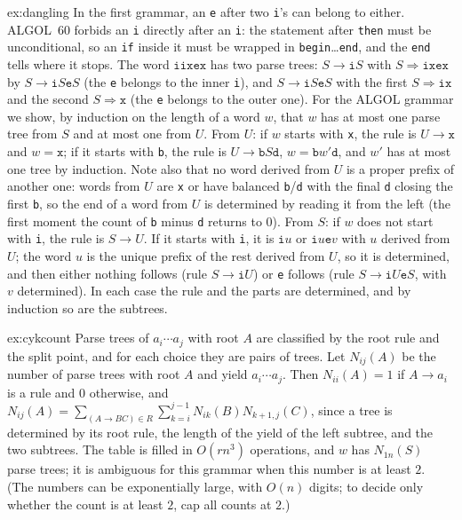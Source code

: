 \begin{solution}{ex:dangling}
\idea In the first grammar, an \texttt e after two \texttt i's can belong to either. ALGOL~60 forbids an \texttt i directly after an \texttt i: the statement after \texttt{then} must be unconditional, so an \texttt{if} inside it must be wrapped in \texttt{begin}\dots\texttt{end}, and the \texttt{end} tells where it stops.
\writeup The word $\texttt{iixex}$ has two parse trees: $S\to\texttt iS$ with $S\Rightarrow\texttt{ixex}$ by $S\to\texttt iS\texttt eS$ (the \texttt e belongs to the inner \texttt i), and $S\to\texttt iS\texttt eS$ with the first $S\Rightarrow\texttt{ix}$ and the second $S\Rightarrow\texttt x$ (the \texttt e belongs to the outer one).
For the ALGOL grammar we show, by induction on the length of a word $w$, that $w$ has at most one parse tree from $S$ and at most one from $U$. From $U$: if $w$ starts with \texttt x, the rule is $U\to\texttt x$ and $w=\texttt x$; if it starts with \texttt b, the rule is $U\to\texttt bS\texttt d$, $w=\texttt bw'\texttt d$, and $w'$ has at most one tree by induction. Note also that no word derived from $U$ is a proper prefix of another one: words from $U$ are \texttt x or have balanced \texttt b/\texttt d with the final \texttt d closing the first \texttt b, so the end of a word from $U$ is determined by reading it from the left (the first moment the count of \texttt b minus \texttt d returns to $0$). From $S$: if $w$ does not start with \texttt i, the rule is $S\to U$. If it starts with \texttt i, it is $\texttt iu$ or $\texttt iu\texttt ev$ with $u$ derived from $U$; the word $u$ is the unique prefix of the rest derived from $U$, so it is determined, and then either nothing follows (rule $S\to\texttt iU$) or \texttt e follows (rule $S\to\texttt iU\texttt eS$, with $v$ determined). In each case the rule and the parts are determined, and by induction so are the subtrees.
\end{solution}

\begin{solution}{ex:cykcount}
\idea Parse trees of $a_i\cdots a_j$ with root $A$ are classified by the root rule and the split point, and for each choice they are pairs of trees.
\writeup Let $N_{ij}(A)$ be the number of parse trees with root $A$ and yield $a_i\cdots a_j$. Then $N_{ii}(A)=1$ if $A\to a_i$ is a rule and $0$ otherwise, and $N_{ij}(A)=\sum_{(A\to BC)\in R}\sum_{k=i}^{j-1}N_{ik}(B)N_{k+1,j}(C)$, since a tree is determined by its root rule, the length of the yield of the left subtree, and the two subtrees. The table is filled in $O(rn^3)$ operations, and $w$ has $N_{1n}(S)$ parse trees; it is ambiguous for this grammar when this number is at least $2$. (The numbers can be exponentially large, with $O(n)$ digits; to decide only whether the count is at least $2$, cap all counts at $2$.)
\end{solution}

